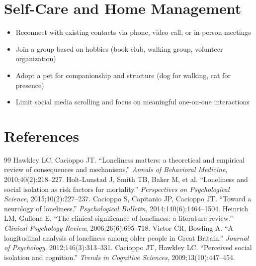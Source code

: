 \section*{Self-Care and Home Management}
\begin{itemize}
  \item Reconnect with existing contacts via phone, video call, or in-person meetings
  \item Join a group based on hobbies (book club, walking group, volunteer organization)
  \item Adopt a pet for companionship and structure (dog for walking, cat for presence)
  \item Limit social media scrolling and focus on meaningful one-on-one interactions
\end{itemize}

\section*{References}
\begin{thebibliography}{99}
 Hawkley LC, Cacioppo JT. ``Loneliness matters: a theoretical and empirical review of consequences and mechanisms.'' \textit{Annals of Behavioral Medicine}, 2010;40(2):218--227.
 Holt-Lunstad J, Smith TB, Baker M, et al. ``Loneliness and social isolation as risk factors for mortality.'' \textit{Perspectives on Psychological Science}, 2015;10(2):227--237.
 Cacioppo S, Capitanio JP, Cacioppo JT. ``Toward a neurology of loneliness.'' \textit{Psychological Bulletin}, 2014;140(6):1464--1504.
 Heinrich LM, Gullone E. ``The clinical significance of loneliness: a literature review.'' \textit{Clinical Psychology Review}, 2006;26(6):695--718.
 Victor CR, Bowling A. ``A longitudinal analysis of loneliness among older people in Great Britain.'' \textit{Journal of Psychology}, 2012;146(3):313--331.
 Cacioppo JT, Hawkley LC. ``Perceived social isolation and cognition.'' \textit{Trends in Cognitive Sciences}, 2009;13(10):447--454.

\end{thebibliography}
